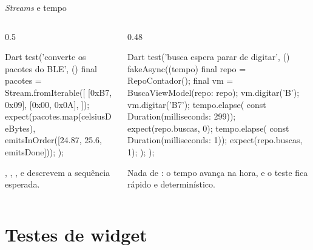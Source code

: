 \documentclass[aspectratio=169,10pt]{beamer}
\begin{document}
\begin{frame}[fragile]{\emph{Streams} e tempo}
  \begin{columns}[T]
    \begin{column}{0.5\textwidth}
\begin{codigo}[title=Streams]{Dart}
test('converte os pacotes do BLE', () {
  final pacotes = Stream.fromIterable([
    [0xB7, 0x09],
    [0x00, 0x0A],
  ]);
  expect(pacotes.map(celsiusDeBytes),
      emitsInOrder([24.87, 25.6, emitsDone]));
});
\end{codigo}
      \begin{conceito}
        , , ,  e  descrevem a sequência esperada.
      \end{conceito}
    \end{column}
    \begin{column}{0.48\textwidth}
\begin{codigo}[title=Tempo controlado (fake\_async)]{Dart}
test('busca espera parar de digitar', () {
  fakeAsync((tempo) {
    final repo = RepoContador();
    final vm = BuscaViewModel(repo: repo);
    vm.digitar('B');
    vm.digitar('B7');
    tempo.elapse(
        const Duration(milliseconds: 299));
    expect(repo.buscas, 0);
    tempo.elapse(
        const Duration(milliseconds: 1));
    expect(repo.buscas, 1);
  });
});
\end{codigo}
      \begin{dica}
        Nada de : o tempo avança na hora, e o teste fica rápido e determinístico.
      \end{dica}
    \end{column}
  \end{columns}
\end{frame}

\section{Testes de widget}
\end{document}
